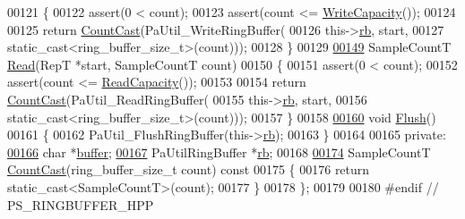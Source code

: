 \begin{DoxyCode}
00121     \{
00122         assert(0 < count);
00123         assert(count <= \hyperlink{classRingBuffer_ab00617ab6e379ad146cb7b80079f4c4c}{WriteCapacity}());
00124 
00125         \textcolor{keywordflow}{return} \hyperlink{classRingBuffer_ae907c82ba714a087d9f35b089f9fbf77}{CountCast}(PaUtil\_WriteRingBuffer(
00126                         this->\hyperlink{classRingBuffer_a10985ec171bcc15c1301dc74fcb6e7b2}{rb}, start,
00127                         static\_cast<ring\_buffer\_size\_t>(count)));
00128     \}
00129 
\hypertarget{ringbuffer_8hpp_source_l00149}{}\hyperlink{classRingBuffer_af892330ee102bd50a493b8afa814a0f0}{00149}     SampleCountT \hyperlink{classRingBuffer_af892330ee102bd50a493b8afa814a0f0}{Read}(RepT *start, SampleCountT count)
00150     \{
00151         assert(0 < count);
00152         assert(count <= \hyperlink{classRingBuffer_a7086cc66306105db205842af7a88c2d8}{ReadCapacity}());
00153 
00154         \textcolor{keywordflow}{return} \hyperlink{classRingBuffer_ae907c82ba714a087d9f35b089f9fbf77}{CountCast}(PaUtil\_ReadRingBuffer(
00155                         this->\hyperlink{classRingBuffer_a10985ec171bcc15c1301dc74fcb6e7b2}{rb}, start,
00156                         static\_cast<ring\_buffer\_size\_t>(count)));
00157     \}
00158 
\hypertarget{ringbuffer_8hpp_source_l00160}{}\hyperlink{classRingBuffer_a1eb1acca6905e7678fbbdb70238cdc26}{00160}     \textcolor{keywordtype}{void} \hyperlink{classRingBuffer_a1eb1acca6905e7678fbbdb70238cdc26}{Flush}()
00161     \{
00162         PaUtil\_FlushRingBuffer(this->\hyperlink{classRingBuffer_a10985ec171bcc15c1301dc74fcb6e7b2}{rb});
00163     \}
00164 
00165 \textcolor{keyword}{private}:
\hypertarget{ringbuffer_8hpp_source_l00166}{}\hyperlink{classRingBuffer_a09103853af3302b27d2bbd46f1dfbe87}{00166}     \textcolor{keywordtype}{char} *\hyperlink{classRingBuffer_a09103853af3302b27d2bbd46f1dfbe87}{buffer};         
\hypertarget{ringbuffer_8hpp_source_l00167}{}\hyperlink{classRingBuffer_a10985ec171bcc15c1301dc74fcb6e7b2}{00167}     PaUtilRingBuffer *\hyperlink{classRingBuffer_a10985ec171bcc15c1301dc74fcb6e7b2}{rb}; 
00168 
\hypertarget{ringbuffer_8hpp_source_l00174}{}\hyperlink{classRingBuffer_ae907c82ba714a087d9f35b089f9fbf77}{00174}     SampleCountT \hyperlink{classRingBuffer_ae907c82ba714a087d9f35b089f9fbf77}{CountCast}(ring\_buffer\_size\_t count)\textcolor{keyword}{ const}
00175 \textcolor{keyword}{    }\{
00176         \textcolor{keywordflow}{return} \textcolor{keyword}{static\_cast<}SampleCountT\textcolor{keyword}{>}(count);
00177     \}
00178 \};
00179 
00180 \textcolor{preprocessor}{#endif // PS\_RINGBUFFER\_HPP}
\end{DoxyCode}
